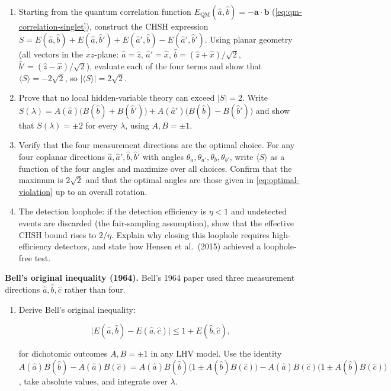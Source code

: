 \begin{problemset}
\begin{enumerate}
\item[(a)] Starting from the quantum correlation function $E_{\text{QM}}(\hat{a},\hat{b}) = -\bm a \cdot \bm b$ (\eqref{eq:qm-correlation-singlet}), construct the CHSH expression $S = E(\hat{a},\hat{b}) + E(\hat{a},\hat{b}') + E(\hat{a}',\hat{b}) - E(\hat{a}',\hat{b}')$. Using planar geometry (all vectors in the $xz$-plane: $\hat{a} = \hat{z}$, $\hat{a}' = \hat{x}$, $\hat{b} = (\hat{z} + \hat{x})/\sqrt{2}$, $\hat{b}' = (\hat{z} - \hat{x})/\sqrt{2}$), evaluate each of the four terms and show that $\langle S\rangle = -2\sqrt{2}$, so $\lvert\langle S\rangle\rvert = 2\sqrt{2}$.
\item[(b)] Prove that no local hidden-variable theory can exceed $\lvert S\rvert = 2$. Write $S(\lambda) = A(\hat{a})\bigl(B(\hat{b}) + B(\hat{b}')\bigr) + A(\hat{a}')\bigl(B(\hat{b}) - B(\hat{b}')\bigr)$ and show that $S(\lambda) = \pm 2$ for every $\lambda$, using $A, B = \pm 1$.
\item[(c)] Verify that the four measurement directions are the optimal choice. For any four coplanar directions $\hat{a}, \hat{a}', \hat{b}, \hat{b}'$ with angles $\theta_a, \theta_{a'}, \theta_b, \theta_{b'}$, write $\langle S\rangle$ as a function of the four angles and maximize over all choices. Confirm that the maximum is $2\sqrt{2}$ and that the optimal angles are those given in \eqref{eq:optimal-violation} up to an overall rotation.
\item[(d)] The detection loophole: if the detection efficiency is $\eta < 1$ and undetected events are discarded (the fair-sampling assumption), show that the effective CHSH bound rises to $2/\eta$. Explain why closing this loophole requires high-efficiency detectors, and state how Hensen et al.\ (2015) achieved a loophole-free test.
\end{enumerate}

\item[Exercise 7.6] \textbf{Bell's original inequality (1964).}
\label{item:ex-bell-original}
Bell's 1964 paper used three measurement directions $\hat{a}, \hat{b}, \hat{c}$ rather than four.

\begin{enumerate}
\item[(a)] Derive Bell's original inequality:
\begin{linenomath}
\begin{equation}
\lvert E(\hat{a},\hat{b}) - E(\hat{a},\hat{c})\rvert \le 1 + E(\hat{b},\hat{c}),
\end{equation}
\end{linenomath}
for dichotomic outcomes $A, B = \pm 1$ in any LHV model. Use the identity $A(\hat{a})B(\hat{b}) - A(\hat{a})B(\hat{c}) = A(\hat{a})B(\hat{b})\bigl(1 \pm A(\hat{b})B(\hat{c})\bigr) - A(\hat{a})B(\hat{c})\bigl(1 \pm A(\hat{b})B(\hat{c})\bigr)$, take absolute values, and integrate over $\lambda$.


\end{enumerate}
\end{problemset}
